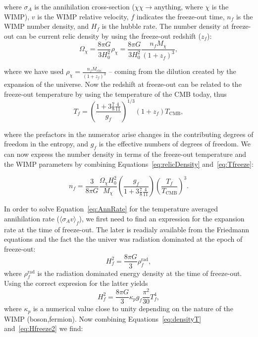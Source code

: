 where $\sigma_{A}$ is the annihilation cross-section
($\chi\chi\rightarrow \mathrm{anything}$, where $\chi$ is the WIMP),
$v$ is the WIMP relative velocity, $f$ indicates the freeze-out time,
$n_{f}$ is the WIMP number density, and $H_{f}$ is the hubble
rate. The number density at freeze-out can be current relic density by
using the freeze-out redshift ($z_{f}$):
\begin{equation}
\label{eq:relicDensity}
\Omega_{\chi} = \frac{8\pi G}{3H^{2}_{0}}\rho_{\chi} = \frac{8\pi G}{3H^{2}_{0}}\frac{n_{f}M_{\chi}}{(1+z_{f})^{3}},
\end{equation}

where we have used $\rho_{\chi} = \frac{n_{f}M_{chi}}{(1+z_{f})^{3}}$
-- coming from the dilution created by the expansion of the
universe. Now the redshift at freeze-out can be related to the
freeze-out temperature by using the temperature of the CMB today, thus
\begin{equation}
\label{eq:Tfreeze}
T_{f} = \left( \frac{1+3\frac{7}{8}\frac{4}{11}}{g_{f}}\right)^{1/3} (1+z_{f})T_{\mathrm{CMB}},
\end{equation}

where the prefactors in the numerator arise changes in the
contributing degrees of freedom in the entropy, and $g_{f}$ is the
effective numbers of degrees of freedom. We can now express the number
density in terms of the freeze-out temperature and the WIMP parameters
by combining Equations~\ref{eq:relicDensity} and~\ref{eq:Tfreeze}:

\begin{equation}
\label{eq:densityT}
n_{f} = \frac{3}{8\pi G}\frac{\Omega_{\chi}H^{2}_{0}}{M_{\chi}}\left(\frac{g_{f}}{1+3\frac{7}{8}\frac{4}{11}}\right)\left(\frac{T_{f}}{T_{\mathrm{CMB}}}\right)^{3}.
\end{equation}

In order to solve Equation~\ref{eq:AnnRate} for the temperature
averaged annihilation rate ($\langle \sigma_{A}v\rangle_{f}$), we
first need to find an expression for the expansion rate at the time of
freeze-out. The later is readialy available from the Friedmann
equations and the fact the the univer was radiation dominated at the
epoch of freeze-out:
\begin{equation}
\label{eq:Hfreeze}
H^{2}_{f} = \frac{8\pi G}{3}\rho^{\mathrm{rad}}_{f},
\end{equation}
where $\rho^{\mathrm{rad}}_{f}$ is the radiation dominated energy
density at the time of freeze-out. Using the correct expresion for the
latter yields
\begin{equation}
\label{eq:Hfreeze2}
H^{2}_{f} = \frac{8\pi G}{3}\kappa_{p}g_{f}\frac{\pi^{2}}{30}T^{4}_{f},
\end{equation}
where $\kappa_{p}$ is a numerical value close to unity depending on
the nature of the WIMP (boson,fermion). Now combining
Equations~\ref{eq:densityT} and~\ref{eq:Hfreeze2} we find:

